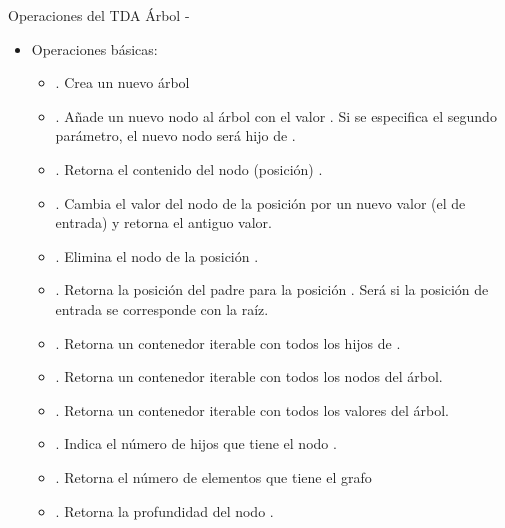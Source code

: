 \documentclass[10pt,envcountsect,spanish]{beamer}
\begin{document}
\begin{frame}[allowframebreaks]{Operaciones del TDA Árbol - }

\begin{itemize}

\item Operaciones básicas:
\begin{itemize}
\item {}. Crea un nuevo árbol

\item {}. Añade un nuevo nodo al árbol con el valor  . Si se especifica el segundo parámetro, el nuevo nodo será hijo de  .

\item {}. Retorna el contenido del nodo (posición)  .

\item {}. Cambia el valor del nodo de la posición  por un nuevo valor (el de entrada) y retorna el antiguo valor.

\item {}. Elimina el nodo de la posición .

\item {}. Retorna la posición del padre para la posición  .
Será   si la posición de entrada se corresponde con la raíz.

\item {}. Retorna un contenedor iterable con todos los hijos de  .

\item {}. Retorna un contenedor iterable con todos los nodos del árbol.

\item {}. Retorna un contenedor iterable con todos los valores del árbol.

\item {}. Indica el número de hijos que tiene el nodo .

\item {}. Retorna el número de elementos que tiene el grafo

\item {}. Retorna la profundidad del nodo .


\end{itemize}
\end{itemize}
\end{frame}
\end{document}
